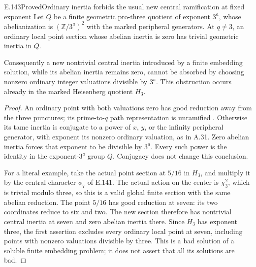 \begin{result}{E.143}{Proved}{Ordinary inertia forbids the usual new central ramification at fixed exponent}
Let \(Q\) be a finite geometric pro-three quotient
of exponent \(3^a\), whose abelianization is
\((\mathbb Z/3^a)^2\) with the marked peripheral
generators. At \(q\ne3\), an ordinary local point
section whose abelian inertia is zero has trivial
geometric inertia in \(Q\).

Consequently a new nontrivial central inertia
introduced by a finite embedding solution, while
its abelian inertia remains zero, cannot be
absorbed by choosing nonzero ordinary integer
valuations divisible by \(3^a\).
This obstruction occurs already in the marked
Heisenberg quotient \(H_3\).
\end{result}
\begin{proof}
An ordinary point with both valuations zero has
good reduction away from the three punctures;
its prime-to-\(q\) path representation is
unramified
\citep[Definition 2.2 and Proposition 2.3, p.200]
{AuditWojtkowiak2007}.
Otherwise its tame inertia is conjugate to a
power of \(x\), \(y\), or the infinity peripheral
generator, with exponent its nonzero ordinary
valuation, as in A.31.
Zero abelian inertia forces that exponent to
be divisible by \(3^a\). Every such power is
the identity in the exponent-\(3^a\) group \(Q\).
Conjugacy does not change this conclusion.

For a literal example, take the actual point
section at \(5/16\) in \(H_3\), and multiply it
by the central character \(\phi_7\) of E.141.
The actual action on the center is \(\chi_3^2\),
which is trivial modulo three, so this is a
valid global finite section with the same
abelian reduction. The point \(5/16\) has good
reduction at seven: its two coordinates reduce
to six and two. The new section therefore has
nontrivial central inertia at seven and zero
abelian inertia there. Since \(H_3\) has
exponent three, the first assertion excludes
every ordinary local point at seven, including
points with nonzero valuations divisible by
three. This is a bad solution of a soluble
finite embedding problem; it does not assert
that all its solutions are bad.
\end{proof}

